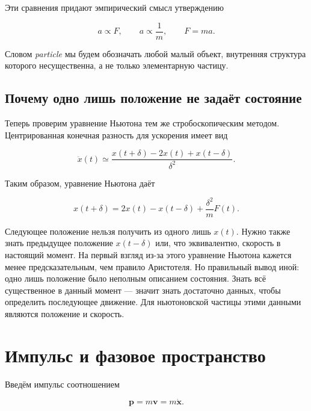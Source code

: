 Эти сравнения придают эмпирический смысл утверждению

\begin{equation}
  a\propto F,
  \qquad
  a\propto\frac{1}{m},
  \qquad
  F=ma.
  \label{eq:force-mass-scaling}
\end{equation}

Словом \emph{particle} мы будем обозначать любой малый объект, внутренняя структура которого несущественна, а не только элементарную частицу.

\subsection{Почему одно лишь положение не задаёт состояние}

Теперь проверим уравнение Ньютона тем же стробоскопическим методом. Центрированная конечная разность для ускорения имеет вид

\begin{equation}
  \ddot x(t)\simeq
  \frac{x(t+\delta)-2x(t)+x(t-\delta)}{\delta^2}.
  \label{eq:second-difference}
\end{equation}

Таким образом, уравнение Ньютона даёт

\begin{equation}
  x(t+\delta)
  =2x(t)-x(t-\delta)+\frac{\delta^2}{m}F(t).
  \label{eq:newton-position-update}
\end{equation}

Следующее положение нельзя получить из одного лишь \(x(t)\). Нужно также знать предыдущее положение \(x(t-\delta)\) или, что эквивалентно, скорость в настоящий момент. На первый взгляд из-за этого уравнение Ньютона кажется менее предсказательным, чем правило Аристотеля. Но правильный вывод иной: одно лишь положение было неполным описанием состояния. Знать всё существенное в данный момент — значит знать достаточно данных, чтобы определить последующее движение. Для ньютоновской частицы этими данными являются положение и скорость.

\section{Импульс и фазовое пространство}

Введём импульс соотношением

\begin{equation}
  \mathbf p=m\mathbf v=m\dot{\mathbf x}.
  \label{eq:momentum-definition}
\end{equation}

